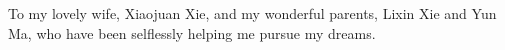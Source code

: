 
\begin{center}
To my lovely wife, Xiaojuan Xie, and my wonderful parents, Lixin Xie and Yun Ma, who have been selflessly helping me pursue my dreams.
\end{center}
